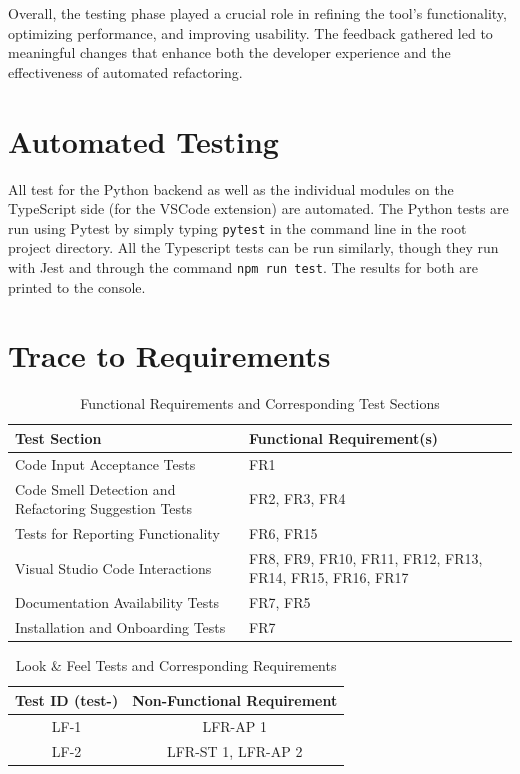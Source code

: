 \documentclass[12pt, titlepage]{article}
\begin{document}
\bigskip
Overall, the testing phase played a crucial role in refining the
tool's functionality, optimizing performance, and improving
usability. The feedback gathered led to meaningful changes that
enhance both the developer experience and the effectiveness of
automated refactoring.

\section{Automated Testing}

All test for the Python backend as well as the individual modules on
the TypeScript side (for the VSCode extension) are automated. The
Python tests are run using Pytest by simply typing \texttt{pytest} in
the command line in the root project directory. All the Typescript
tests can be run similarly, though they run with Jest and through the
command \texttt{npm run test}. The results for both are printed to the console.

\section{Trace to Requirements}

\begin{table}[H]
  \centering
  \caption{Functional Requirements and Corresponding Test Sections}
  \begin{tabular}{p{}p{}}
    \toprule \textbf{Test Section} & \textbf{Functional Requirement(s)} \\
    \midrule
    Code Input Acceptance Tests & FR1 \\
    Code Smell Detection and Refactoring Suggestion Tests & FR2, FR3, FR4 \\
    Tests for Reporting Functionality & FR6, FR15 \\
    Visual Studio Code Interactions & FR8, FR9, FR10, FR11, FR12, FR13, FR14, FR15, FR16, FR17 \\
    Documentation Availability Tests & FR7, FR5 \\
    Installation and Onboarding Tests & FR7 \\
    \bottomrule
  \end{tabular}
  \label{tab:sections_requirements}
\end{table}


  \label{tab:nfr-trace-reqs}
  \begin{table}[H]
  \centering
  \caption{Look \& Feel Tests and Corresponding Requirements}
  \label{tab:nfr-trace-lf}
  \begin{tabular}{cc}
    \toprule \textbf{Test ID (test-)} & \textbf{Non-Functional Requirement} \\
    \midrule
    LF-1 & LFR-AP 1 \\
    LF-2 & LFR-ST 1, LFR-AP 2 \\
    \bottomrule
  \end{tabular}
\end{table}
\end{document}
